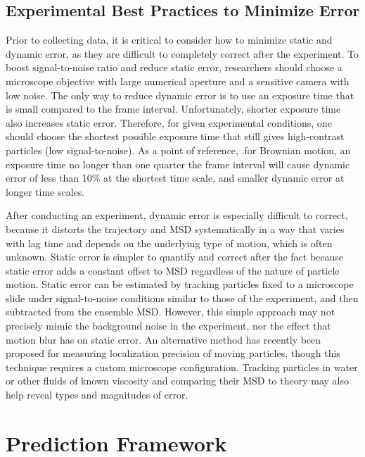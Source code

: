 \subsection{Experimental Best Practices to Minimize Error}
Prior to collecting data, it is critical to consider how to minimize static and dynamic error, as they are difficult to completely correct after the experiment. To boost signal-to-noise ratio and reduce static error, researchers should choose a microscope objective with large numerical aperture and a sensitive camera with low noise. The only way to reduce dynamic error is to use an exposure time that is small compared to the frame interval\cite{Savin2005,Crocker2007}. Unfortunately, shorter exposure time also increases static error. Therefore, for given experimental conditions, one should choose the shortest possible exposure time that still gives high-contrast particles (low signal-to-noise). As a point of reference, \cite{Crocker2007}.for Brownian motion, an exposure time no longer than one quarter the frame interval will cause dynamic error of less than 10\% at the shortest time scale, and smaller dynamic error at longer time scales.

After conducting an experiment, dynamic error is especially difficult to correct, because it distorts the trajectory and MSD systematically in a way that varies with lag time and depends on the underlying type of motion, which is often unknown\cite{Savin2005}. Static error is simpler to quantify and correct after the fact because static error adds a constant offset to MSD regardless of the nature of particle motion. Static error can be estimated by tracking particles fixed to a microscope slide under signal-to-noise conditions similar to those of the experiment, and then subtracted from the ensemble MSD. However, this simple approach may not precisely mimic the background noise in the experiment, nor the effect that motion blur has on static error. An alternative method has recently been proposed for measuring localization precision of moving particles, though this technique requires a custom microscope configuration\cite{Deschout2012}. Tracking particles in water or other fluids of known viscosity and comparing their MSD to theory may also help reveal types and magnitudes of error. 

\section{\label{sec:prediction}Prediction Framework}


